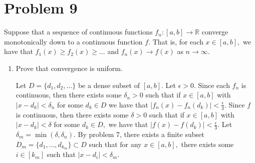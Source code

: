 \documentclass[11pt]{article}
\newcommand{\bbR}{\mathbb{R}}
\begin{document}
\section*{Problem 9}
\begin{problem}
    Suppose that a sequence of continuous functions $f_n: [a,b]\to \bbR$ converge monotonically down to a continuous function $f.$ That is, for each $x\in [a,b],$ we have that $f_1(x)\geq f_2(x) \geq \dots $ and $f_n(x) \to f(x)$ as $n\to \infty.$
\end{problem}
\begin{enumerate}
    \item 
    \begin{problem}
        Prove that convergence is uniform.
    \end{problem}
    \begin{solution}
        Let $D = \{d_1, d_2, \dots\}$ be a dense subset of $[a,b].$
        Let $\epsilon>0.$ Since each $f_n$ is continuous, then there exists some $\delta_n>0$ such that if $x\in [a,b]$ with $|x-d_k|< \delta_n$ for some $d_k \in D$ we have that $|f_n(x) - f_n(d_k)|< \frac{\epsilon}{3}.$ Since $f$ is continuous, then there exists some $\delta>0$ such that if $x\in [a,b]$ with $|x-d_k|< \delta$ for some $d_k\in D,$ we have that $|f(x) - f(d_k)|< \frac{\epsilon}{3}.$ Let $\delta_m = \min(\delta, \delta_n).$ By problem 7, there exists a finite subset $D_m = \{d_1, \dots, d_{k_m}\}\subset D$ such that for any $x\in [a,b],$ there exists some $i\in [k_m]$ such that $|x-d_i|< \delta_m.$\\


\end{solution}
\end{enumerate}
\end{document}
